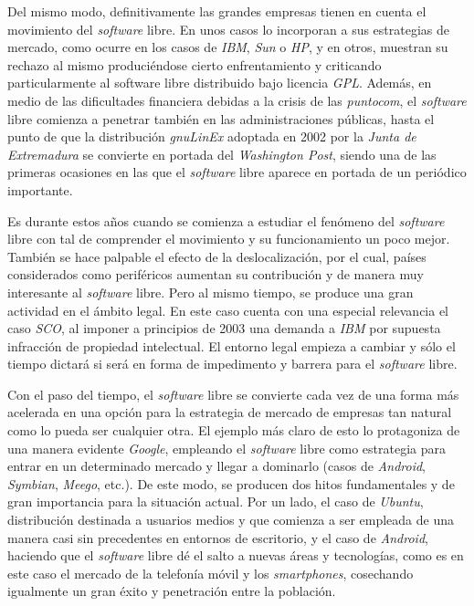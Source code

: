 Del mismo modo, definitivamente las grandes empresas tienen en cuenta el
movimiento del \textit{software} libre. En unos casos lo incorporan a sus
estrategias de mercado, como ocurre en los casos de \textit{IBM}, \textit{Sun} o
\textit{HP}, y en otros, muestran su rechazo al mismo produciéndose cierto
enfrentamiento y criticando particularmente al software libre distribuido bajo
licencia \textit{GPL}. Además, en medio de las dificultades financiera debidas a
la crisis de las \textit{puntocom}, el \textit{software} libre comienza a
penetrar también en las administraciones públicas, hasta el punto de que la
distribución \textit{gnuLinEx} adoptada en 2002 por la \textit{Junta de
Extremadura} se convierte en portada del \textit{Washington Post}, siendo una de
las primeras ocasiones en las que el \textit{software} libre aparece en portada
de un periódico importante.

Es durante estos años cuando se comienza a estudiar el fenómeno del
\textit{software} libre con tal de comprender el movimiento y su funcionamiento
un poco mejor. También se hace palpable el efecto de la deslocalización, por el
cual, países considerados como periféricos aumentan su contribución y de manera
muy interesante al \textit{software} libre. Pero al mismo tiempo, se produce una
gran actividad en el ámbito legal. En este caso cuenta con una especial
relevancia el caso \textit{SCO}, al imponer a principios de 2003 una demanda a
\textit{IBM} por supuesta infracción de propiedad intelectual. El entorno legal
empieza a cambiar y sólo el tiempo dictará si será en forma de impedimento y
barrera para el \textit{software} libre.

Con el paso del tiempo, el \textit{software} libre se convierte cada vez de una
forma más acelerada en una opción para la estrategia de mercado de empresas tan
natural como lo pueda ser cualquier otra. El ejemplo más claro de esto lo
protagoniza de una manera evidente \textit{Google}, empleando el
\textit{software} libre como estrategia para entrar en un determinado mercado y
llegar a dominarlo (casos de \textit{Android}, \textit{Symbian}, \textit{Meego},
etc.). De este modo, se producen dos hitos fundamentales y de gran importancia
para la situación actual. Por un lado, el caso de \textit{Ubuntu}, distribución
destinada a usuarios medios y que comienza a ser empleada de una manera casi sin
precedentes en entornos de escritorio, y el caso de \textit{Android}, haciendo
que el \textit{software} libre dé el salto a nuevas áreas y tecnologías, como es
en este caso el mercado de la telefonía móvil y los \textit{smartphones},
cosechando igualmente un gran éxito y penetración entre la población.

